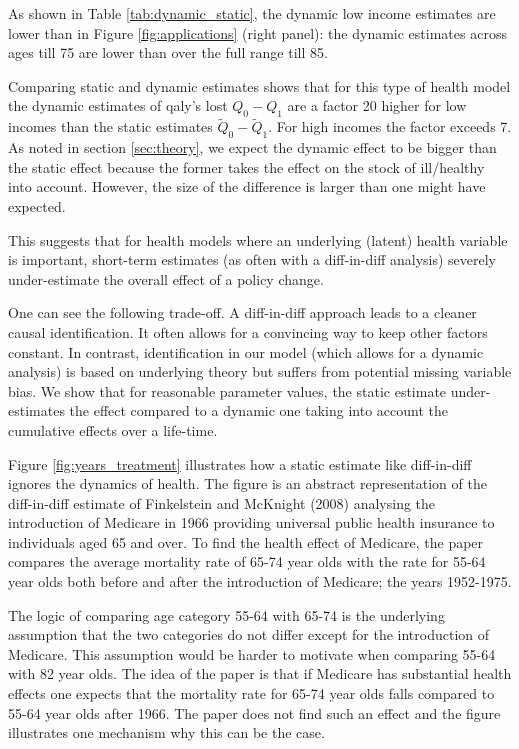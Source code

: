 \documentclass[a4paper,12pt]{article}
\makeatletter
\newcommand{\cslcitation}[2]
 {\protect\hyper@linkstart{cite}{citeproc_bib_item_#1}#2\hyper@linkend}
\makeatother
\begin{document}
As shown in Table \ref{tab:dynamic_static}, the dynamic low income estimates are lower than in Figure \ref{fig:applications} (right panel): the dynamic estimates across ages till 75 are lower than over the full range till 85.

Comparing static and dynamic estimates shows that for this type of health model the dynamic estimates of qaly's lost \(Q_0-Q_1\) are a factor 20 higher for low incomes than the static estimates \(\tilde Q_0 - \tilde Q_1\). For high incomes the factor exceeds 7. As noted in section \ref{sec:theory}, we expect the dynamic effect to be bigger than the static effect because the former takes the effect on the stock of ill/healthy into account. However, the size of the difference is larger than one might have expected.


This suggests that for health models where an underlying (latent) health variable is important, short-term estimates (as often with a diff-in-diff analysis) severely under-estimate the overall effect of a policy change.

One can see the following trade-off. A diff-in-diff approach leads to a cleaner causal identification. It often allows for a convincing way to keep other factors constant. In contrast, identification in our model (which allows for a dynamic analysis) is based on underlying theory but suffers from potential missing variable bias. We show that for reasonable parameter values, the static estimate under-estimates the effect compared to a dynamic one taking into account the cumulative effects over a life-time.

Figure \ref{fig:years_treatment} illustrates how a static estimate like diff-in-diff ignores the dynamics of health. The figure is an abstract representation of the diff-in-diff estimate of Finkelstein and McKnight (\cslcitation{4}{2008}) analysing the introduction of Medicare in 1966 providing universal public health insurance to individuals aged 65 and over. To find the health effect of Medicare, the paper compares the average mortality rate of 65-74 year olds with the rate for 55-64 year olds both before and after the introduction of Medicare; the years 1952-1975. 

The logic of comparing age category 55-64 with 65-74 is the underlying assumption that the two categories do not differ except for the introduction of Medicare. This assumption would be harder to motivate when comparing 55-64 with 82 year olds. The idea of the paper is that if Medicare has substantial health effects one expects that the mortality rate for 65-74 year olds falls compared to 55-64 year olds after 1966. The paper does not find such an effect and the figure illustrates one mechanism why this can be the case.
\end{document}
